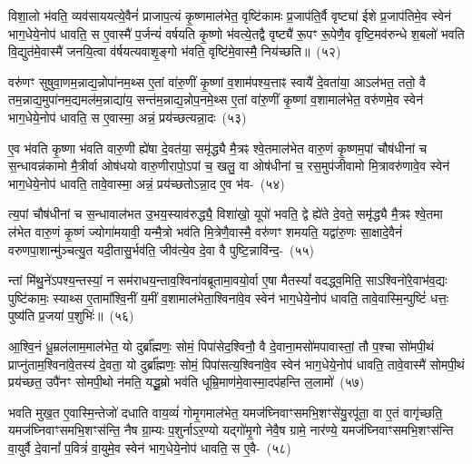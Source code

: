 विशा॒लो भ॑वति॒ व्यव॑साययत्ये॒वैनं॑ प्राजाप॒त्यं कृ॒ष्णमा\-ल॑भेत॒ वृष्टि॑कामः प्र॒जा\-प॑ति॒र्वै वृष्ट्या॑ ईशे प्र॒जा\-प॑तिमे॒व स्वेन॑ भाग॒धेये॒नोप॑ धावति॒ स ए॒वास्मै॑ प॒र्जन्यं॑ वर्\mbox{}षयति कृ॒ष्णो भ॑वत्ये॒तद्वै वृष्ट्यै॑ रू॒पꣳ रू॒पेणै॒व वृष्टि॒मव॑\-रुन्धे श॒बलो॑ भवति वि॒द्युत॑मे॒वास्मै॑ जनयि॒त्वा व॑र्\mbox{}षयत्यवाशृ॒ङ्गो भ॑वति॒ वृष्टि॑मे॒वास्मै॒ निय॑च्छति॥~(५२)

{\anuvakamend[शृ॒णाति॑ मिथु॒नाना᳚न्नयति यच्छति॥]}

वरु॑णꣳ सुषुवा॒णम॒न्नाद्य॒न्नोपा॑नम॒थ्स ए॒तां वा॑रु॒णीं कृ॒ष्णां व॒शाम॑पश्य॒त्ताꣴ स्वायै॑ दे॒वता॑या॒ आ\-ऽल॑भत॒ ततो॒ वै तम॒न्नाद्य॒मुपा॑नम॒द्यमल॑म॒न्नाद्या॑य॒ सन्त॑म॒न्नाद्य॒न्नोप॒नमे॒थ्स ए॒तां वा॑रु॒णीं कृ॒ष्णां व॒शामा\-ल॑भेत॒ वरु॑णमे॒व स्वेन॑ भाग॒धेये॒नोप॑ धावति॒ स ए॒वास्मा॒ अन्नं॒ प्रय॑च्छत्यन्ना॒दः~(५३)

ए॒व भ॑वति कृ॒ष्णा भ॑वति वारु॒णी ह्ये॑षा दे॒वत॑या॒ समृ॑द्ध्यै मै॒त्रꣴ श्वे॒तमाल॑भेत वारु॒णं कृ॒ष्णम॒पां चौष॑धीनां च स॒न्धावन्न॑कामो मै॒त्रीर्वा ओष॑धयो वारु॒णीरापो॒\-ऽपां च॒ खलु॒ वा ओष॑धीनां च॒ रस॒मुप॑जीवामो मि॒त्रावरु॑णावे॒व स्वेन॑ भाग॒धेये॒नोप॑ धावति॒ तावे॒वास्मा॒ अन्नं॒ प्रय॑च्छतो\-ऽन्ना॒द ए॒व भ॑व-~(५४)

त्य॒पां चौष॑धीनां च स॒न्धावाल॑भत उ॒भय॒स्याव॑रुद्ध्यै॒ विशा॑खो॒ यूपो॑ भवति॒ द्वे ह्ये॑ते दे॒वते॒ समृ॑द्ध्यै मै॒त्रꣴ श्वे॒तमा ल॑भेत वारु॒णं कृ॒ष्णं ज्योगा॑मयावी॒ यन्मै॒त्रो भव॑ति मि॒त्रेणै॒वास्मै॒ वरु॑णꣳ शमयति॒ यद्वा॑रु॒णः सा॒क्षादे॒वैनं॑ वरुण\-पा॒शान्मु॑ञ्चत्यु॒त यदी॒तासु॒र्भव॑ति॒ जीव॑त्ये॒व दे॒वा वै पुष्टि॒न्नावि॑न्द॒-~(५५)

न्तां मि॑थु॒ने॑\-ऽपश्य॒न्तस्यां॒ न सम॑राधय॒न्ताव॒श्विना॑\-वब्रूतामा॒वयो॒र्वा ए॒षा मैतस्यां᳚ वदद्ध्व॒मिति॒ सा\-ऽश्विनो॑रे॒वाभ॑व॒द्यः पुष्टि॑कामः॒ स्याथ्स ए॒तामा᳚श्वि॒नीं य॒मीं व॒शामाल॑भेता॒श्विना॑वे॒व स्वेन॑ भाग॒धेये॒नोप॑ धावति॒ तावे॒वास्मि॒न्पुष्टिं॑ धत्तः॒ पुष्य॑ति प्र॒जया॑ प॒शुभिः॑॥~(५६)

{\anuvakamend[{अ॒न्ना॒दो᳚\-ऽन्ना॒द ए॒व भ॑वत्यविन्द॒न्पञ्च॑चत्वारिꣳशच्च}]}

आ॒श्वि॒नं धू॒म्रल॑लाम॒मा\-ल॑भेत॒ यो दुर्ब्रा᳚ह्मणः॒ सोमं॒ पिपा॑सेद॒श्विनौ॒ वै दे॒वाना॒मसो॑मपावास्तां॒ तौ प॒श्चा सो॑मपी॒थं प्राप्नु॑ताम॒श्विना॑वे॒तस्य॑ दे॒वता॒ यो दुर्ब्रा᳚ह्मणः॒ सोमं॒ पिपा॑सत्य॒श्विना॑वे॒व स्वेन॑ भाग॒धेये॒नोप॑ धावति॒ तावे॒वास्मै॑ सोमपी॒थं प्रय॑च्छत॒ उपै॑नꣳ सोमपी॒थो न॑मति॒ यद्धू॒म्रो भव॑ति धूम्रि॒माण॑मे॒वास्मा॒दप॑हन्ति ल॒लामो॑~(५७)

भवति मुख॒त ए॒वास्मि॒न्तेजो॑ दधाति वाय॒व्यं॑ गोमृ॒गमा\-ल॑भेत॒ यमज॑घ्निवाꣳसमभि॒शꣳसे॑यु॒रपू॑ता॒ वा ए॒तं वागृ॑च्छति॒ यमज॑घ्निवाꣳसमभि॒शꣳस॑न्ति॒ नैष ग्रा॒म्यः प॒शुर्नाऽर॒ण्यो यद्गो॑मृ॒गो नेवै॒ष ग्रामे॒ नार॑ण्ये॒ यमज॑घ्निवाꣳसमभि॒शꣳस॑न्ति वा॒युर्वै दे॒वानां᳚ प॒वित्रं॑ वा॒युमे॒व स्वेन॑ भाग॒धेये॒नोप॑ धावति॒ स ए॒वै-~(५८)


